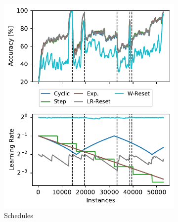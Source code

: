 \documentclass{article} %
\begin{document}
\def\asize{0.5\textwidth}
\begin{figure}[ht]
   \centering
   \begin{subfigure}[b]{\asize}
      \includegraphics[width=\textwidth]{figures/lr_norms_schedules_insects_abrupt.pdf}
      \caption{Schedules}
      \label{fig:prequential_schedulers_insects}
   \end{subfigure}
   \begin{subfigure}[b]{0.99\textwidth - \asize}

\end{subfigure}
\end{figure}
\end{document}
